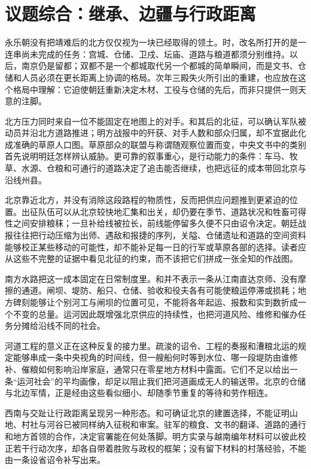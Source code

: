 \section{议题综合：继承、边疆与行政距离}

永乐朝没有把靖难后的北方仅仅视为一块已经取得的领土。时，改名所打开的是一连串尚未完成的任务：宫城、仓储、卫戍、坛庙、道路与粮道都须分别维持。以后，南京仍是留都；双都不是一个都城取代另一个都城的简单瞬间，而是文书、仓储和人员必须在更长距离上协调的格局。次年三殿失火所引出的重建，也应放在这个格局中理解：它迫使朝廷重新决定木材、工役与仓储的先后，而非只提供一则天意的注脚。

北方压力同时来自一位不能固定在地图上的对手。和其后的北征，可以确认军队被动员并沿北方道路推进；明方战报中的歼获、对手人数和部众归属，却不宜据此化成准确的草原人口图。草原部众的联盟与称谓随观察位置而变，中央文书中的类别首先说明明廷怎样辨认威胁。更可靠的叙事重心，是行动能力的条件：车马、牧草、水源、仓粮和可通行的道路决定了追击能否继续，也把远征的成本带回北京与沿线州县。

北京靠近北方，并没有消除这段路程的物质性，反而把供应问题推到更紧迫的位置。出征队伍可以从北京较快地汇集和出关，却仍要在季节、道路状况和牲畜可得性之间安排粮秣；一旦补给线被拉长，前线能停留多久便不只由诏令决定。朝廷战报往往把行动压缩为出师、遇敌和报捷的序列，关隘、仓储遗址和道路的空间资料能够校正某些移动的可能性，却不能补足每一日的行军或草原各部的选择。读者应从这些不完整的证据中看见北征的约束，而不该把它们拼成一张全知的作战图。

南方水路把这一成本固定在日常制度里。和并不表示一条从江南直达京师、没有摩擦的通道。闸坝、堤防、船只、仓储、验收和役夫各有可能使粮运停滞或损耗；地方碑刻能够让个别河工与闸坝的位置可见，不能将各年起运、报数和实到数折成一个不变的总量。运河因此既增强北京供应的持续性，也把河道风险、维修和催办任务分摊给沿线不同的社会。

河道工程的意义正在这种反复的接力里。疏浚的诏令、工程的奏报和漕粮北运的规定能够串成一条中央视角的时间线，但一艘船何时等到水位、哪一段堤防由谁修补、催粮如何影响沿岸家庭，通常只在零星地方材料中露面。它们不足以给出一条“运河社会”的平均画像，却足以阻止我们把河道画成无人的输送带。北京的仓储与北边军情，正是经由这些看似细小、却随季节重复的等待和劳作相连。

西南与交趾让行政距离呈现另一种形态。和可确证北京的建置选择，不能证明山地、村社与河谷已被同样纳入征税和审案。驻军的粮食、文书的翻译、道路的通行和地方首领的合作，决定官署能在何处落脚。明方实录与越南编年材料可以彼此校正若干行动次序，却各自带着胜败与政权的框架；没有留下材料的村落经验，不能由一条设省诏令补写出来。

